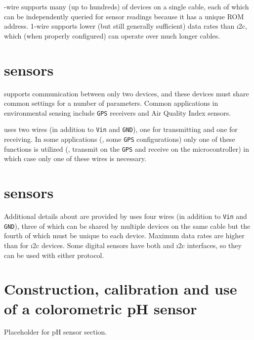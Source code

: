 -wire supports many (up to hundreds) of devices on a single cable, each of which can be independently queried for sensor readings because it has a unique ROM address.
1-wire supports lower (but still generally sufficient) data rates than \i2c, which (when properly configured) can operate over much longer cables.   


\section{\uart sensors}
	\uart supports communication between only two devices, and these devices must share common settings for a number of parameters. %
Common applications in environmental sensing include \texttt{GPS} receivers and Air Quality Index sensors.

\uart uses two wires (in addition to \texttt{Vin} and \texttt{GND}), one for transmitting and one for receiving.
In some applications (\eg, some \texttt{GPS} configurations) only one of these functions is utilized (\eg, transmit on the \texttt{GPS} and receive on the microcontroller) in which case only one of these wires is necessary.

\section{\spi sensors}
	Additional details about \spi are provided by  uses four wires (in addition to \texttt{Vin} and \texttt{GND}), three of which can be shared by multiple devices on the same cable but the fourth of which must be unique to each device.
Maximum data rates are higher than for \i2c devices.
Some digital sensors have both \spi and \i2c interfaces, so they can be used with either protocol.






\vspace{10cm}


\section{Construction, calibration and use of a colorometric pH sensor}
Placeholder for pH sensor section.
